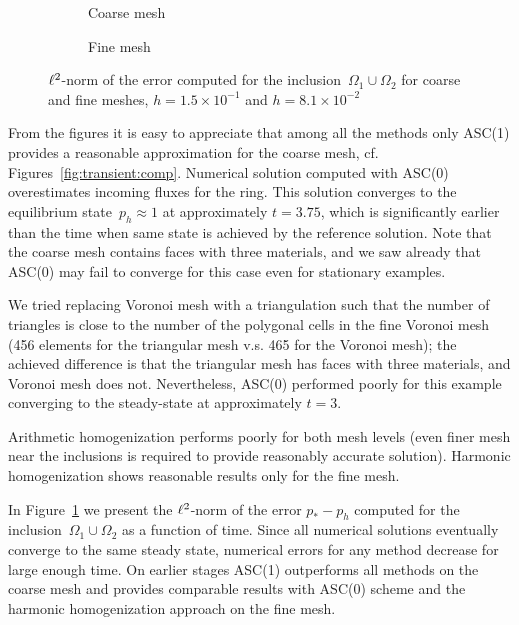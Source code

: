 \clearpage

\begin{figure}[h]
	\centering
	\begin{subfigure}{.8\linewidth}
		\centering
		\caption{Coarse mesh}
	\end{subfigure}%
	\par
	\begin{subfigure}{.8\linewidth}
		\centering
		\caption{Fine mesh}	
	\end{subfigure}%
	\caption{${\ell^2}$-norm of the error computed for the inclusion~$\Omega_1 \cup \Omega_2$ for coarse and fine meshes, $h = 1.5 \times 10^{-1}$ and $h = 8.1 \times 10^{-2}$ \label{fig:transient:err}}
\end{figure}

From the figures it is easy to appreciate  that among all the methods only  ASC(1)  provides a reasonable approximation for the coarse mesh, cf. Figures~\ref{fig:transient:comp}.
Numerical solution computed with ASC(0) overestimates incoming fluxes for the ring. This solution converges to the equilibrium state~$p_h \approx 1$ at approximately $t = 3.75$, which is significantly earlier than the time when same state is achieved by the reference solution. Note that the coarse mesh contains faces with three materials, and we saw already that ASC(0) may fail to converge for this case even for stationary examples. 

We tried replacing Voronoi mesh with a triangulation such that the number of triangles is close to the number of the polygonal cells in the fine Voronoi mesh (456 elements for the triangular mesh v.s. 465 for the Voronoi mesh); the achieved difference is that the triangular mesh has faces with three materials, and Voronoi mesh does not. Nevertheless, ASC(0) performed poorly for this example converging to the steady-state at approximately $t = 3$.
	
Arithmetic homogenization performs poorly for both mesh levels (even finer mesh near the inclusions is required to provide reasonably accurate solution). Harmonic homogenization shows reasonable results only for the fine mesh.

In Figure~\ref{fig:transient:err} we present the ${\ell^2}$-norm of the error $p_* - p_h$ computed for the inclusion~$\Omega_1 \cup \Omega_2$ as a function of time. Since all numerical solutions eventually converge to the same steady state, numerical errors for any method decrease for large enough time. On earlier stages ASC(1) outperforms all methods on the coarse mesh and provides comparable results with ASC(0) scheme and the harmonic homogenization approach on the fine mesh.

